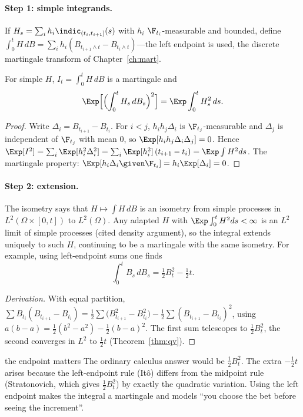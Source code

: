 \paragraph{Step 1: simple integrands.} If $H_s=\sum_{i}h_i\indic_{(t_i,t_{i+1}]}(s)$ with $h_i$ $\F_{t_i}$-measurable and bounded, define
$\int_0^tH\,dB=\sum_ih_i(B_{t_{i+1}\wedge t}-B_{t_i\wedge t})$---the left endpoint is used,
the discrete martingale transform of Chapter~\ref{ch:mart}.

\begin{theorem}[It\^o isometry]\label{thm:itoisometry}
For simple $H$, $I_t=\int_0^tH\,dB$ is a martingale and
\[
\Exp\Bigl[\Bigl(\int_0^tH_s\,dB_s\Bigr)^2\Bigr]=\Exp\int_0^tH_s^2\,ds .
\]
\end{theorem}
\begin{proof}
Write $\Delta_i=B_{t_{i+1}}-B_{t_i}$. For $i<j$, $h_ih_j\Delta_i$ is $\F_{t_j}$-measurable and
$\Delta_j$ is independent of $\F_{t_j}$ with mean $0$, so $\Exp[h_ih_j\Delta_i\Delta_j]=0$.
Hence $\Exp[I^2]=\sum_i\Exp[h_i^2\Delta_i^2]=\sum_i\Exp[h_i^2]\,(t_{i+1}-t_i)=\Exp\int H^2ds$.
The martingale property: $\Exp[h_i\Delta_i\given\F_{t_i}]=h_i\Exp[\Delta_i]=0$.
\end{proof}

\paragraph{Step 2: extension.} The isometry says that $H\mapsto\int H\,dB$ is an isometry from
simple processes in $L^2(\Omega\times[0,t])$ to $L^2(\Omega)$. Any adapted $H$ with
$\Exp\int_0^tH^2ds<\infty$ is an $L^2$ limit of simple processes (cited density
argument), so the integral extends uniquely to such $H$, continuing to be a martingale
with the same isometry. For example, using left-endpoint sums one finds
\[
\int_0^tB_s\,dB_s=\tfrac12B_t^2-\tfrac12t .
\]
\begin{proof}[Derivation]
With equal partition, $\sum B_{t_i}(B_{t_{i+1}}-B_{t_i})=\tfrac12\sum\bigl(B_{t_{i+1}}^2-B_{t_i}^2\bigr)-\tfrac12\sum(B_{t_{i+1}}-B_{t_i})^2$,
using $a(b-a)=\tfrac12(b^2-a^2)-\tfrac12(b-a)^2$. The first sum telescopes to
$\tfrac12B_t^2$, the second converges in $L^2$ to $\tfrac12t$ (Theorem~\ref{thm:qv}).
\end{proof}

\begin{pitfall}{the endpoint matters}
The ordinary calculus answer would be $\tfrac12B_t^2$. The extra $-\tfrac12t$ arises because
the left-endpoint rule (It\^o) differs from the midpoint rule (Stratonovich, which
gives $\tfrac12B_t^2$) by exactly the quadratic variation. Using the left endpoint makes the
integral a martingale and models ``you choose the bet before seeing the increment''.
\end{pitfall}

